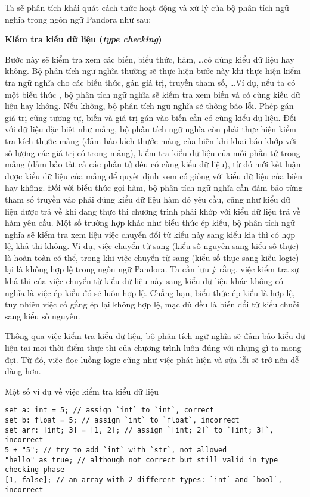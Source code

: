     Ta sẽ phân tích khái quát cách thức hoạt động và xử lý của bộ phân tích ngữ nghĩa trong ngôn ngữ Pandora như sau:

\noindent \textbf{Kiểm tra kiểu dữ liệu (\textit{type checking})}

    Bước này sẽ kiểm tra xem các biến, biểu thức, hàm, \dots có đúng kiểu dữ liệu hay không. Bộ phân tích ngữ nghĩa thường sẽ thực hiện bước này khi thực hiện kiểm tra ngữ nghĩa cho các biểu thức, gán giá trị, truyền tham số, \dots Ví dụ, nếu ta có một biểu thức , bộ phân tích ngữ nghĩa sẽ kiểm tra xem biến  và  có cùng kiểu dữ liệu hay không. Nếu không, bộ phân tích ngữ nghĩa sẽ thông báo lỗi. Phép gán giá trị cũng tương tự, biến và giá trị gán vào biến cần có cùng kiểu dữ liệu. Đối với dữ liệu đặc biệt như mảng, bộ phân tích ngữ nghĩa còn phải thực hiện kiểm tra kích thước mảng (đảm bảo kích thước mảng của biến khi khai báo khớp với số lượng các giá trị có trong mảng), kiểm tra kiểu dữ liệu của mỗi phần tử trong mảng (đảm bảo tất cả các phần tử đều có cùng kiểu dữ liệu), từ đó mới kết luận được kiểu dữ liệu của mảng để quyết định xem có giống với kiểu dữ liệu của biến hay không. Đối với biểu thức gọi hàm, bộ phân tích ngữ nghĩa cần đảm bảo từng tham số truyền vào phải đúng kiểu dữ liệu hàm đó yêu cầu, cũng như kiểu dữ liệu được trả về khi đang thực thi chương trình phải khớp với kiểu dữ liệu trả về hàm yêu cầu. Một số trường hợp khác như biểu thức ép kiểu, bộ phân tích ngữ nghĩa sẽ kiểm tra xem liệu việc chuyển đổi từ kiểu này sang kiểu kia thì có hợp lệ, khả thi không. Ví dụ, việc chuyển từ  sang  (kiểu số nguyên sang kiểu số thực) là hoàn toàn có thể, trong khi việc chuyển từ  sang  (kiểu số thực sang kiểu logic) lại là không hợp lệ trong ngôn ngữ Pandora. Ta cần lưu ý rằng, việc kiểm tra sự khả thi của việc chuyển từ kiểu dữ liệu này sang kiểu dữ liệu khác không có nghĩa là việc ép kiểu đó sẽ luôn hợp lệ. Chẳng hạn, biểu thức ép kiểu  là hợp lệ, tuy nhiên việc cố gắng ép  lại không hợp lệ, mặc dù đều là biến đổi từ kiểu chuỗi sang kiểu số nguyên. 

    Thông qua việc kiểm tra kiểu dữ liệu, bộ phân tích ngữ nghĩa sẽ đảm bảo kiểu dữ liệu tại mọi thời điểm thực thi của chương trình luôn đúng với những gì ta mong đợi. Từ đó, việc đọc luồng logic cũng như việc phát hiện và sửa lỗi sẽ trở nên dễ dàng hơn.

\noindent Một số ví dụ về việc kiểm tra kiểu dữ liệu
\begin{lstlisting}[]
set a: int = 5; // assign `int` to `int`, correct
set b: float = 5; // assign `int` to `float`, incorrect
set arr: [int; 3] = [1, 2]; // assign `[int; 2]` to `[int; 3]`, incorrect
5 + "5"; // try to add `int` with `str`, not allowed
"hello" as true; // although not correct but still valid in type checking phase
[1, false]; // an array with 2 different types: `int` and `bool`, incorrect
\end{lstlisting}

